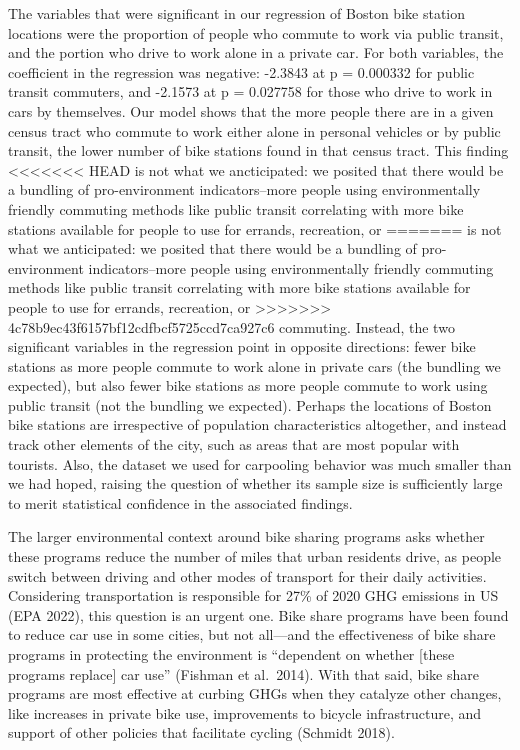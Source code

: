 \documentclass[
  12pt,
]{article}
\begin{document}
\begin{longtable}[]
The variables that were significant in our regression of Boston bike
station locations were the proportion of people who commute to work via
public transit, and the portion who drive to work alone in a private
car. For both variables, the coefficient in the regression was negative:
-2.3843 at p = 0.000332 for public transit commuters, and -2.1573 at p =
0.027758 for those who drive to work in cars by themselves. Our model
shows that the more people there are in a given census tract who commute
to work either alone in personal vehicles or by public transit, the
lower number of bike stations found in that census tract. This finding
<<<<<<< HEAD
is not what we ancticipated: we posited that there would be a bundling
of pro-environment indicators--more people using environmentally
friendly commuting methods like public transit correlating with more
bike stations available for people to use for errands, recreation, or
=======
is not what we anticipated: we posited that there would be a bundling of
pro-environment indicators--more people using environmentally friendly
commuting methods like public transit correlating with more bike
stations available for people to use for errands, recreation, or
>>>>>>> 4c78b9ec43f6157bf12cdfbcf5725ccd7ca927c6
commuting. Instead, the two significant variables in the regression
point in opposite directions: fewer bike stations as more people commute
to work alone in private cars (the bundling we expected), but also fewer
bike stations as more people commute to work using public transit (not
the bundling we expected). Perhaps the locations of Boston bike stations
are irrespective of population characteristics altogether, and instead
track other elements of the city, such as areas that are most popular
with tourists. Also, the dataset we used for carpooling behavior was
much smaller than we had hoped, raising the question of whether its
sample size is sufficiently large to merit statistical confidence in the
associated findings.

The larger environmental context around bike sharing programs asks
whether these programs reduce the number of miles that urban residents
drive, as people switch between driving and other modes of transport for
their daily activities. Considering transportation is responsible for
27\% of 2020 GHG emissions in US (EPA 2022), this question is an urgent
one. Bike share programs have been found to reduce car use in some
cities, but not all---and the effectiveness of bike share programs in
protecting the environment is ``dependent on whether {[}these programs
replace{]} car use'' (Fishman et al.~2014). With that said, bike share
programs are most effective at curbing GHGs when they catalyze other
changes, like increases in private bike use, improvements to bicycle
infrastructure, and support of other policies that facilitate cycling
(Schmidt 2018).


\end{longtable}
\end{document}
